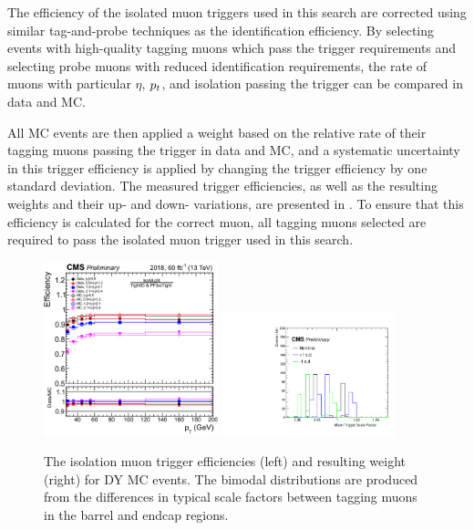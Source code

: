 The efficiency of the isolated muon triggers used in this search are corrected using similar tag-and-probe techniques as the identification efficiency. 
By selecting events with high-quality tagging muons which pass the trigger requirements and selecting probe muons with reduced identification requirements, the rate of muons with particular $\eta$, $p_t$, and isolation passing the trigger can be compared in data and MC.

All MC events are then applied a weight based on the relative rate of their tagging muons passing the trigger in data and MC, and a systematic uncertainty in this trigger efficiency is applied by changing the trigger efficiency by one standard deviation.
The measured trigger efficiencies, as well as the resulting weights and their up- and down- variations, are presented in .
To ensure that this efficiency is calculated for the correct muon, all tagging muons selected are required to pass the isolated muon trigger used in this search.

\begin{figure}[ht]
	\centering
	\includegraphics[width=0.45\textwidth]{figures/muTrigEff_2018.pdf}
        \hspace{0.01\textwidth}
        \includegraphics[width=0.45\textwidth]{figures/trigSF.pdf}
	\caption[Muon Trigger Efficiencies and Weights]{The isolation muon trigger efficiencies (left) and resulting weight (right) for DY MC events. The bimodal distributions are produced from the differences in typical scale factors between tagging muons in the barrel and endcap regions.}
        \label{fig:muTrigSFs}
\end{figure}

